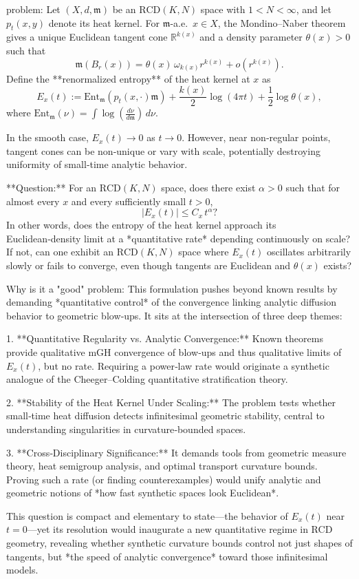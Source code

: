 problem:  
Let \((X,d,\mathfrak{m})\) be an \(\mathrm{RCD}(K,N)\) space with \(1<N<\infty\), and let \(p_t(x,y)\) denote its heat kernel. For \(\mathfrak{m}\)-a.e.\ \(x\in X\), the Mondino–Naber theorem gives a unique Euclidean tangent cone \(\mathbb{R}^{k(x)}\) and a density parameter \(\theta(x)>0\) such that
\[
\mathfrak{m}(B_r(x))=\theta(x)\,\omega_{k(x)}r^{k(x)}+o(r^{k(x)}).
\]
Define the **renormalized entropy** of the heat kernel at \(x\) as
\[
E_x(t):=\mathrm{Ent}_{\mathfrak{m}}(p_t(x,\cdot)\mathfrak{m})+\frac{k(x)}{2}\log(4\pi t)+\frac12\log\theta(x),
\]
where \(\mathrm{Ent}_{\mathfrak{m}}(\nu)=\int\log\!\left(\frac{d\nu}{d\mathfrak{m}}\right)\,d\nu\).

In the smooth case, \(E_x(t)\to 0\) as \(t\to 0\). However, near non‑regular points, tangent cones can be non‑unique or vary with scale, potentially destroying uniformity of small‑time analytic behavior.

**Question:**  
For an \(\mathrm{RCD}(K,N)\) space, does there exist \(\alpha>0\) such that for almost every \(x\) and every sufficiently small \(t>0\),
\[
|E_x(t)| \le C_x\,t^{\alpha}?
\]
In other words, does the entropy of the heat kernel approach its Euclidean‑density limit at a *quantitative rate* depending continuously on scale?  
If not, can one exhibit an \(\mathrm{RCD}(K,N)\) space where \(E_x(t)\) oscillates arbitrarily slowly or fails to converge, even though tangents are Euclidean and \(\theta(x)\) exists?

Why is it a "good" problem:  
This formulation pushes beyond known results by demanding *quantitative control* of the convergence linking analytic diffusion behavior to geometric blow‑ups. It sits at the intersection of three deep themes:

1. **Quantitative Regularity vs. Analytic Convergence:**  
   Known theorems provide qualitative mGH convergence of blow‑ups and thus qualitative limits of \(E_x(t)\), but no rate. Requiring a power‑law rate would originate a synthetic analogue of the Cheeger–Colding quantitative stratification theory.

2. **Stability of the Heat Kernel Under Scaling:**  
   The problem tests whether small‑time heat diffusion detects infinitesimal geometric stability, central to understanding singularities in curvature‑bounded spaces.

3. **Cross‑Disciplinary Significance:**  
   It demands tools from geometric measure theory, heat semigroup analysis, and optimal transport curvature bounds. Proving such a rate (or finding counterexamples) would unify analytic and geometric notions of *how fast synthetic spaces look Euclidean*.

This question is compact and elementary to state—the behavior of \(E_x(t)\) near \(t=0\)—yet its resolution would inaugurate a new quantitative regime in RCD geometry, revealing whether synthetic curvature bounds control not just shapes of tangents, but *the speed of analytic convergence* toward those infinitesimal models.